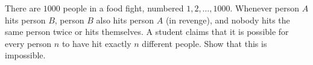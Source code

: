 There are $1000$ people in a food fight, numbered $1,2,\dots,1000$. Whenever person $A$ hits person $B$, person $B$ also hits person $A$ (in revenge), and nobody hits the same person twice or hits themselves. A student claims that it is possible for every person $n$ to have hit exactly $n$ different people. Show that this is impossible.
